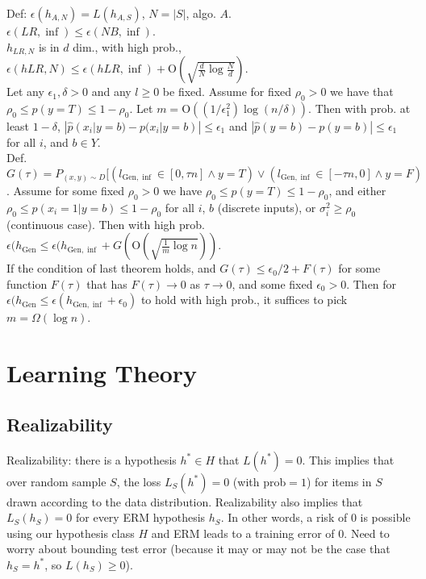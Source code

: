 Def: $\epsilon(h_{A, N}) = L(h_{A, S})$, $N = |S|$, algo. $A$.\\
$\epsilon(LR, \inf) \leq \epsilon(NB, \inf)$.\\
$h_{LR, N}$ is in $d$ dim., with high prob., $\epsilon(h{LR, N}) \leq \epsilon(h{LR, \inf}) + \text{O}(\sqrt{\frac{d}{N}\log\frac{N}{d}})$.\\
Let any $\epsilon_1, \delta > 0$ and any $l \geq 0$ be fixed. Assume for fixed $\rho_0 > 0$ we have that $\rho_0 \leq p(y=T) \leq 1-\rho_0$. Let $m=\text{O}((1/\epsilon_1^2)\log(n/\delta))$. Then with prob. at least $1-\delta$, $|\hat{p}(x_i|y=b)-p(x_i|y=b)|\leq \epsilon_1$ and $|\hat{p}(y=b)-p(y=b)|\leq \epsilon_1$ for all $i$, and $b \in Y$.\\
Def. $G(\tau) = P_{(x, y) \sim D}[(l_{\text{Gen}, \inf}\in [0, \tau n]\wedge y=T) \vee (l_{\text{Gen}, \inf}\in [-\tau n, 0] \wedge y=F)$. Assume for some fixed $\rho_0 > 0$ we have $\rho_0 \leq p(y=T) \leq 1-\rho_0$, and either $\rho_0 \leq p(x_i=1|y=b) \leq 1-\rho_0$ for all $i$, $b$ (discrete inputs), or $\sigma_i^2 \geq \rho_0$ (continuous case). Then with high prob. $\epsilon(h_{\text{Gen}} \leq \epsilon(h_{\text{Gen}, \inf} + G(\text{O}(\sqrt{\frac{1}{m}\log n}))$.\\
If the condition of last theorem holds, and $G(\tau) \leq \epsilon_0 / 2 + F(\tau)$ for some function $F(\tau)$ that has $F(\tau) \rightarrow 0$ as $\tau \rightarrow 0$, and some fixed $\epsilon_0 > 0$. Then for $\epsilon(h_{\text{Gen}} \leq \epsilon(h_{\text{Gen}, \inf} + \epsilon_0)$ to hold with high prob., it suffices to pick $m = \Omega(\log n)$.

\section{Learning Theory}

\subsection*{Realizability}

Realizability: there is a hypothesis $h^* \in H$ that $L(h^*) = 0$. This implies that over random sample $S$, the loss $L_S(h^*)=0$
(with prob$=1$) for items in $S$ drawn according to the data distribution. Realizability also implies that $L_S(h_S)=0$ for every ERM hypothesis $h_S$. In other words, a risk of $0$ is possible using our hypothesis class $H$ and ERM leads to a training error of $0$. Need to worry about bounding test error (because it may or may not be the case that $h_S=h^*$, so $L(h_S) \geq 0$).

